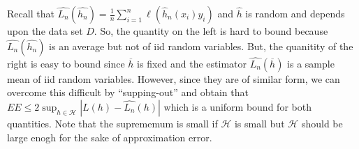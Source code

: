 \documentclass[
]{article}
\begin{document}
Recall that
\(\hat{L_n}(\hat{h_n}) = \frac{1}{n} \sum_{i=1}^n \ell(\hat{h}_n(x_i)y_i)\)
and \(\hat{h}\) is random and depends upon the data set \(D\). So, the
quantity on the left is hard to bound because \(\hat{L_n}(\hat{h_n})\)
is an average but not of iid random variables. But, the quanitity of the
right is easy to bound since \(\overline{h}\) is fixed and the estimator
\(\hat{L_n}(\overline{h})\) is a sample mean of iid random variables.
However, since they are of similar form, we can overcome this difficult
by ``supping-out'' and obtain that
\(EE \leq 2 \sup_{h \in \mathcal{H}} |L(h)- \hat{L_n}(h)|\) which is a
uniform bound for both quantities. Note that the suprememum is small if
\(\mathcal{H}\) is small but \(\mathcal{H}\) should be large enogh for
the sake of approximation error.
\end{document}

